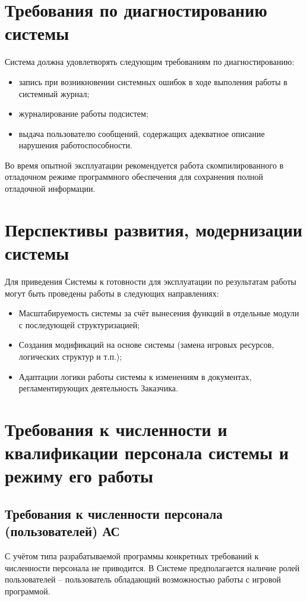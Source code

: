 \section{Требования по диагностированию системы}
Система должна удовлетворять следующим требованиям по диагностированию:
\begin{itemize}
    \item запись при возникновении системных ошибок в ходе выполения работы в системный журнал;
    \item журналирование работы подсистем;
    \item выдача пользователю сообщений, содержащих адекватное описание нарушения 
        работоспособности.
\end{itemize}
Во время опытной эксплуатации рекомендуется работа скомпилированного в отладочном режиме 
программного обеспечения для сохранения полной отладочной информации.

\section{Перспективы развития, модернизации системы}
Для приведения Системы к готовности для эксплуатации по результатам работы могут быть 
проведены работы в следующих направлениях:
\begin{itemize}
    \item Масштабируемость системы за счёт вынесения функций в отдельные модули с 
        последующей структуризацией;
    \item Создания модификаций на основе системы (замена игровых ресурсов, логических 
        структур и т.п.);
    \item Адаптации логики работы системы к изменениям в документах, регламентирующих 
        деятельность Заказчика.
\end{itemize}

\section{Требования к численности и квалификации персонала системы и режиму его работы}
\subsection{Требования к численности персонала (пользователей) АС}
С учётом типа разрабатываемой программы конкретных требований к численности персонала не 
приводится. В Системе предполагается наличие ролей пользователей -- пользователь 
обладающий возможностью работы с игровой программой.

